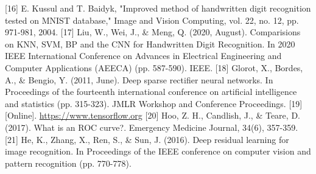 \documentclass[11pt]{article}
\begin{document}
[16]  E. Kussul and T. Baidyk, "Improved method of handwritten digit  recognition tested on MNIST database," Image and Vision  Computing, vol. 22, no. 12, pp. 971-981, 2004.
[17] Liu, W., Wei, J., \& Meng, Q. (2020, August). Comparisions on KNN, SVM, BP and the CNN for Handwritten Digit Recognition. In 2020 IEEE International Conference on Advances in Electrical Engineering and Computer Applications (AEECA) (pp. 587-590). IEEE.
[18] Glorot, X., Bordes, A., \& Bengio, Y. (2011, June). Deep sparse rectifier neural networks. In Proceedings of the fourteenth international conference on artificial intelligence and statistics (pp. 315-323). JMLR Workshop and Conference Proceedings.
[19] [Online]. \url{https://www.tensorflow.org} 
[20] Hoo, Z. H., Candlish, J., \& Teare, D. (2017). What is an ROC curve?. Emergency Medicine Journal, 34(6), 357-359.
[21] He, K., Zhang, X., Ren, S., \& Sun, J. (2016). Deep residual learning for image recognition. In Proceedings of the IEEE conference on computer vision and pattern recognition (pp. 770-778).
\end{document}
